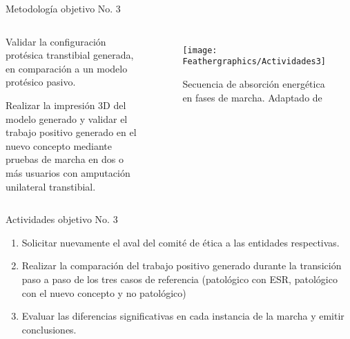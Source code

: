 \documentclass[10pt]{beamer}
\begin{document}
\begin{frame}{Metodología objetivo No. 3}

\begin{columns}[t]


\column{30 mm}
\begin{block}{{\footnotesize{}Validar la configuración protésica transtibial generada,
en comparación a un modelo protésico pasivo.}}

{\footnotesize{}Realizar la impresión 3D del modelo generado y validar
el trabajo positivo generado en el nuevo concepto mediante pruebas
de marcha en dos o más usuarios con amputación unilateral transtibial.}{\footnotesize \par}
\end{block}

\column{90 mm}

\begin{figure}
\begin{centering}
\texttt{[image: Feathergraphics/Actividades3]}
\par\end{centering}
\caption{{\scriptsize{}Secuencia de absorción energética en fases de marcha.
Adaptado de \cite{Collins2010}}}
\end{figure}

\end{columns}

\end{frame}

\begin{frame}{Actividades objetivo No. 3}

\begin{enumerate}
\item Solicitar nuevamente el aval del comité de ética a las entidades respectivas.
\item Realizar la comparación del trabajo positivo generado durante la transición
paso a paso de los tres casos de referencia (patológico con ESR, patológico
con el nuevo concepto y no patológico)
\item Evaluar las diferencias significativas en cada instancia de la marcha
y emitir conclusiones.
\end{enumerate}
\end{frame}
\end{document}
